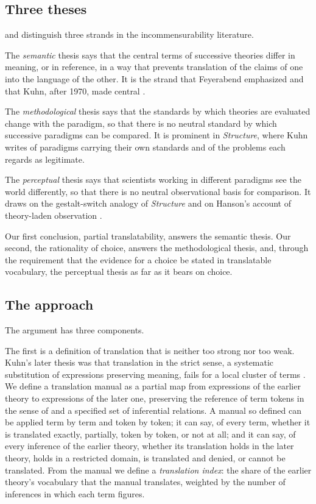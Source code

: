 \documentclass{situationist-preprint}
\begin{document}
\subsection{Three theses}

\citet{HoyningenHueneSankey2001} and \citet{Sankey1994} distinguish three strands in the incommensurability literature.

The \emph{semantic} thesis says that the central terms of successive theories differ in meaning, or in reference, in a way that prevents translation of the claims of one into the language of the other. It is the strand that Feyerabend emphasized and that Kuhn, after 1970, made central \citep{Kuhn1983,Kuhn1991}.

The \emph{methodological} thesis says that the standards by which theories are evaluated change with the paradigm, so that there is no neutral standard by which successive paradigms can be compared. It is prominent in \emph{Structure}, where Kuhn writes of paradigms carrying their own standards and of the problems each regards as legitimate.

The \emph{perceptual} thesis says that scientists working in different paradigms see the world differently, so that there is no neutral observational basis for comparison. It draws on the gestalt-switch analogy of \emph{Structure} and on Hanson's account of theory-laden observation \citep{Hanson1958}.

Our first conclusion, partial translatability, answers the semantic thesis. Our second, the rationality of choice, answers the methodological thesis, and, through the requirement that the evidence for a choice be stated in translatable vocabulary, the perceptual thesis as far as it bears on choice.

\subsection{The approach}

The argument has three components.

The first is a definition of translation that is neither too strong nor too weak. Kuhn's later thesis was that translation in the strict sense, a systematic substitution of expressions preserving meaning, fails for a local cluster of terms \citep{Kuhn1983}. We define a translation manual as a partial map from expressions of the earlier theory to expressions of the later one, preserving the reference of term tokens in the sense of \citet{Kitcher1978} and a specified set of inferential relations. A manual so defined can be applied term by term and token by token; it can say, of every term, whether it is translated exactly, partially, token by token, or not at all; and it can say, of every inference of the earlier theory, whether its translation holds in the later theory, holds in a restricted domain, is translated and denied, or cannot be translated. From the manual we define a \emph{translation index}: the share of the earlier theory's vocabulary that the manual translates, weighted by the number of inferences in which each term figures.
\end{document}
